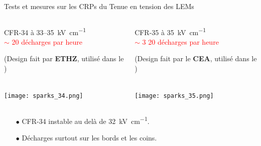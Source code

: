     \begin{frame}{Tests et mesures sur les CRPs du \SSS{}}{Tenue en tension des LEMs}
   		\begin{columns}
    		\begin{column}{0.5\textwidth}
    			\begin{center}
	    			\begin{scriptsize}
		    			CFR-34 à 33--\SI{35}{\kilo\volt\per\centi\meter}\\
		    			\textcolor{red}{$\sim$ 20 décharges par heure}\\
		    		\end{scriptsize}
	    			\begin{tiny}
		    			(Design fait par \textbf{ETHZ}, utilisé dans le \TOO{})
		    		\end{tiny}\\
	    			\texttt{[image: sparks\_34.png]}
    			\end{center}
    		\end{column}\hfill
    		\begin{column}{0.5\textwidth}
    			\begin{center}
	    			\begin{scriptsize}
		    			CFR-35 à \SI{35}{\kilo\volt\per\centi\meter} \\
		    			\textcolor{red}{$\sim$ 3 20 décharges par heure}\\
		    		\end{scriptsize}
	    			\begin{tiny}
	    				(Design fait par le \textbf{CEA}, utilisé dans le \SSS{})
	   				\end{tiny}\\
	    			\texttt{[image: sparks\_35.png]}
	    		\end{center}
    		\end{column}
    	\end{columns}\vspace{0.1cm}
    	\begin{columns}
    		\begin{column}{0.5\textwidth}
    			\begin{scriptsize}
	    			\begin{itemize}
	    				\item[$\bullet$] CFR-34 instable au delà de \SI{32}{\kilo\volt\per\centi\meter}.
	    				\item[$\bullet$] Décharges surtout sur les bords et les coins.
	    			\end{itemize}
	    			\begin{itemize}

\end{itemize}
\end{scriptsize}
\end{column}
\end{columns}
\end{frame}
